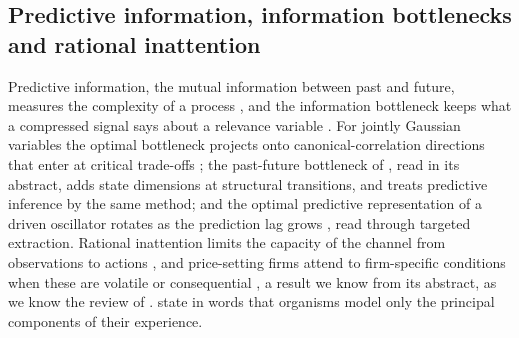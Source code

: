 \subsection{Predictive information, information bottlenecks and rational inattention}\label{sec:rel-sensing}

Predictive information, the mutual information between past and future, measures the complexity of a process \citep{bialek2001predictability}, and the information bottleneck keeps what a compressed signal says about a relevance variable \citep{tishby2000information}. For jointly Gaussian variables the optimal bottleneck projects onto canonical-correlation directions that enter at critical trade-offs \citep[Theorem~3.1]{chechik2005information}; the past-future bottleneck of \citet{creutzig2009past}, read in its abstract, adds state dimensions at structural transitions, and \citet{still2014information} treats predictive inference by the same method; and the optimal predictive representation of a driven oscillator rotates as the prediction lag grows \citep{sachdeva2021optimal}, read through targeted extraction. Rational inattention limits the capacity of the channel from observations to actions \citep{sims2003implications}, and price-setting firms attend to firm-specific conditions when these are volatile or consequential \citep{mackowiak2009optimal}, a result we know from its abstract, as we know the review of \citet{mackowiak2023rational}. \citet[Section~7.2]{fields2022competency} state in words that organisms model only the principal components of their experience.

